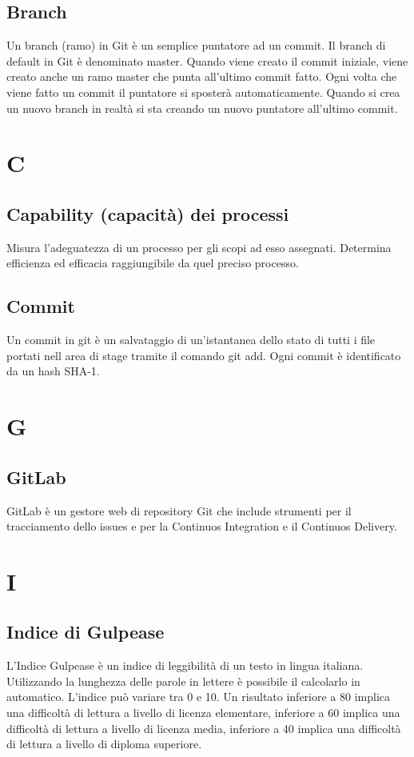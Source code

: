 \documentclass[11pt,a4paper]{article}
\begin{document}
	\subsection{Branch}
	Un branch (ramo) in Git è un semplice puntatore ad un commit. Il branch di default in Git è denominato master. Quando viene creato il commit iniziale, viene creato anche un ramo master che punta all'ultimo commit fatto. Ogni volta che viene fatto un commit il puntatore si sposterà automaticamente. Quando si crea un nuovo branch in realtà si sta creando un nuovo puntatore all'ultimo commit.
	\section{C}
	\subsection{Capability (capacità) dei processi}
	Misura l'adeguatezza di un processo per gli scopi ad esso assegnati. Determina efficienza ed efficacia raggiungibile da quel preciso processo.
	\subsection{Commit}
	Un commit in git è un salvataggio di un'istantanea dello stato di tutti i file portati nell area di stage tramite il comando git add. Ogni commit è identificato da un hash SHA-1.
	\section{G}
	\subsection{GitLab}
	GitLab è un gestore web di repository Git che include strumenti per il tracciamento dello issues e per la Continuos Integration e il Continuos Delivery.
	\section{I}
	\subsection{Indice di Gulpease}
	L'Indice Gulpease è un indice di leggibilità di un testo in lingua italiana. Utilizzando la lunghezza delle parole in lettere è possibile il calcolarlo in automatico.
	L'indice può variare tra 0 e 10. Un risultato inferiore a 80 implica una difficoltà di lettura a livello di licenza elementare, inferiore a 60 implica una difficoltà di lettura a livello di licenza media, inferiore a 40 implica una difficoltà di lettura a livello di diploma superiore.
\end{document}
